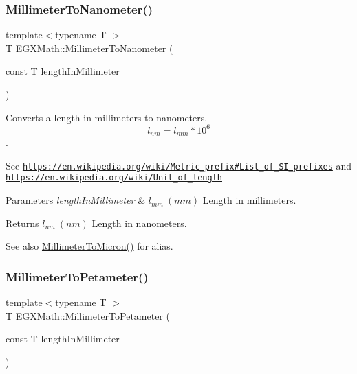 \subsubsection{\texorpdfstring{Millimeter\+To\+Nanometer()}{MillimeterToNanometer()}}
{\footnotesize\ttfamily template$<$typename T $>$ \\
T E\+G\+X\+Math\+::\+Millimeter\+To\+Nanometer (\begin{DoxyParamCaption}\item[{const T}]{length\+In\+Millimeter }\end{DoxyParamCaption})}



Converts a length in millimeters to nanometers. \[ l_{nm}=l_{mm} * 10^{6} \]. 

See \href{https://en.wikipedia.org/wiki/Metric_prefix#List_of_SI_prefixes}{\tt https\+://en.\+wikipedia.\+org/wiki/\+Metric\+\_\+prefix\#\+List\+\_\+of\+\_\+\+S\+I\+\_\+prefixes} and \href{https://en.wikipedia.org/wiki/Unit_of_length}{\tt https\+://en.\+wikipedia.\+org/wiki/\+Unit\+\_\+of\+\_\+length} 
\begin{DoxyParams}{Parameters}
{\em length\+In\+Millimeter} & $ l_{mm}\ (mm)$ Length in millimeters. \\
\hline
\end{DoxyParams}
\begin{DoxyReturn}{Returns}
$ l_{nm}\ (nm)$ Length in nanometers. 
\end{DoxyReturn}
\begin{DoxySeeAlso}{See also}
\mbox{\hyperlink{group___e_g_x_math-_conversions-_length_conversions-_millimeter-_non-_s_i_ga47eac74d2eeec20afc801e61d53f67a0}{Millimeter\+To\+Micron()}} for alias. 
\end{DoxySeeAlso}
\mbox{\label{group___e_g_x_math-_conversions-_length_conversions-_millimeter-_s_i_ga02c5ee4941d1915c4d6d2b96788bb89f}} 
\subsubsection{\texorpdfstring{Millimeter\+To\+Petameter()}{MillimeterToPetameter()}}
{\footnotesize\ttfamily template$<$typename T $>$ \\
T E\+G\+X\+Math\+::\+Millimeter\+To\+Petameter (\begin{DoxyParamCaption}\item[{const T}]{length\+In\+Millimeter }\end{DoxyParamCaption})}



